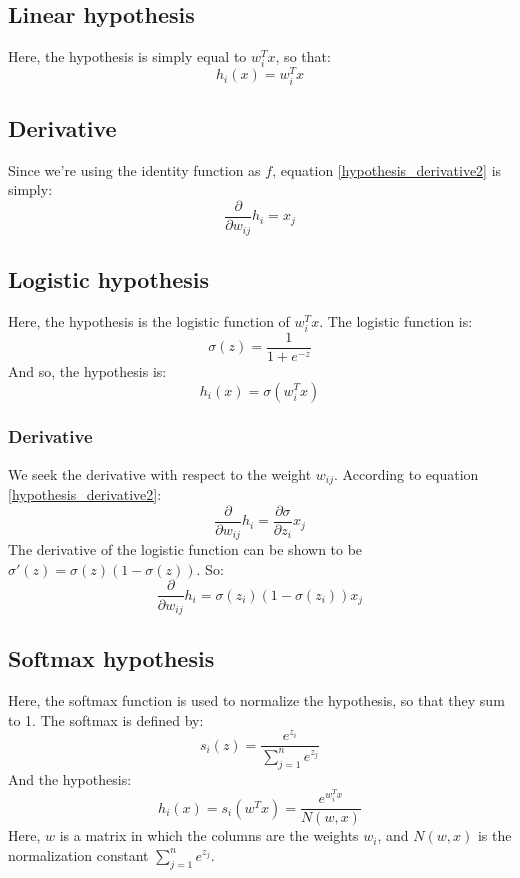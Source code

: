 \documentclass[12pt, a4paper]{article}
\numberwithin{equation}{section}
\begin{document}
\subsection{Linear hypothesis}
Here, the hypothesis is simply equal to $w_i^T x$, so that:
\begin{equation}
\label{hyp_linear}
h_i(x)=w_i^Tx
\end{equation}

\subsection{Derivative}
Since we're using the identity function as $f$, equation \ref{hypothesis_derivative2} is simply:
\begin{equation}
\frac{\partial}{\partial w_{ij}}h_i=x_j
\end{equation}

\subsection{Logistic hypothesis}
Here, the hypothesis is the logistic function of $w_i^T x$. The logistic function is:
\begin{equation}
\sigma(z)=\frac{1}{1+e^{-z}}
\end{equation}
And so, the hypothesis is:
\begin{equation}
\label{hyp_logistic}
h_i(x)=\sigma(w_i^T x)
\end{equation}

\subsubsection{Derivative}
We seek the derivative with respect to the weight $w_{ij}$. According to equation \ref{hypothesis_derivative2}:
\begin{equation}
\frac{\partial}{\partial w_{ij}}h_i=\frac{\partial\sigma}{\partial z_i}x_j
\end{equation}
The derivative of the logistic function can be shown to be $\sigma'(z)=\sigma(z)(1-\sigma(z))$. So:
\begin{equation}
\frac{\partial}{\partial w_{ij}}h_i=\sigma(z_i)(1-\sigma(z_i))x_j
\end{equation}

\subsection{Softmax hypothesis}
Here, the softmax function is used to normalize the hypothesis, so that they sum to 1. The softmax is defined by:
\begin{equation}
s_i(z)=\frac{e^{z_i}}{\sum_{j=1}^n e^{z_j}}
\end{equation}
And the hypothesis:
\begin{equation}
\label{hyp_softmax}
h_i(x)=s_i(w^T x)=\frac{e^{w_i^T x}}{N(w,x)}
\end{equation}
Here, $w$ is a matrix in which the columns are the weights $w_i$, and $N(w,x)$ is the normalization constant $\sum_{j=1}^n e^{z_j}$.
\end{document}
